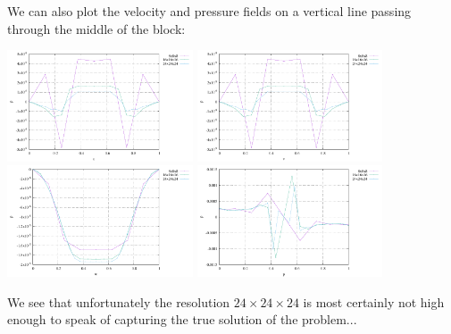 We can also plot the velocity and pressure fields on a vertical line passing 
through the middle of the block:
\begin{center}
\includegraphics[width=5.5cm]{python_codes/fieldstone_82/results/bench4/vert_u}
\includegraphics[width=5.5cm]{python_codes/fieldstone_82/results/bench4/vert_v}
\includegraphics[width=5.5cm]{python_codes/fieldstone_82/results/bench4/vert_w}
\includegraphics[width=5.5cm]{python_codes/fieldstone_82/results/bench4/vert_p}
\end{center}
We see that unfortunately the resolution $24\times 24 \times 24$ is most certainly not high 
enough to speak of capturing the true solution of the problem...

